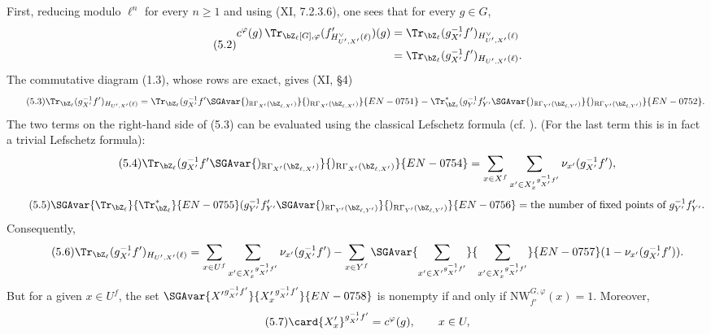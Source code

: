 First, reducing modulo $\ell^n$ for every $n\ge1$ and using (XI, 7.2.3.6), one sees that for every $g\in G$,
\begin{equation}\tag{5.2}
\begin{aligned}
c^\varphi(g)\,\Tr_{\bZ_\ell[G],\varphi}(f'_{H^\vee_{U',X'}(\ell)})(g)
&=\Tr_{\bZ_\ell}(g_{X'}^{-1}f')_{H^\vee_{U',X'}(\ell)}\\
&=\Tr_{\bZ_\ell}(g_{X'}^{-1}f')_{H_{U',X'}(\ell)}.
\end{aligned}
\end{equation}
The commutative diagram (1.3), whose rows are exact, gives (XI, \S4)
\begin{equation}\tag{5.3}
\Tr_{\bZ_\ell}(g_{X'}^{-1}f')_{H_{U',X'}(\ell)}
=\Tr_{\bZ_\ell}(g_{X'}^{-1}f'\SGAvar{)_{\mathbb{R}\Gamma_{X'}(\bZ_{\ell,X'})}}{)_{\mathrm{R}\Gamma_{X'}(\bZ_{\ell,X'})}}{EN-0751}
-\Tr^*_{\bZ_\ell}(g_{Y'}^{-1}f'_{Y'}\SGAvar{)_{\mathbb{R}\Gamma_{Y'}(\bZ_{\ell,Y'})}}{)_{\mathrm{R}\Gamma_{Y'}(\bZ_{\ell,Y'})}}{EN-0752}.
\end{equation}
The two terms on the right-hand side of (5.3) can be evaluated using the classical Lefschetz formula (cf. ). (For the last term this is in fact a trivial Lefschetz formula):
\begin{equation}\tag{5.4}
\Tr_{\bZ_\ell}(g_{X'}^{-1}f'\SGAvar{)_{\mathbb{R}\Gamma_{X'}(\bZ_{\ell,X'})}}{)_{\mathrm{R}\Gamma_{X'}(\bZ_{\ell,X'})}}{EN-0754}
=\sum_{x\in X^f}\sum_{x'\in {X'_x}^{g_{X'}^{-1}f'}}\nu_{x'}(g_{X'}^{-1}f'),
\end{equation}
\begin{equation}\tag{5.5}
\SGAvar{\Tr_{\bZ_\ell}}{\Tr^*_{\bZ_\ell}}{EN-0755}(g_{Y'}^{-1}f'_{Y'}\SGAvar{)_{\mathbb{R}\Gamma_{Y'}(\bZ_{\ell,Y'})}}{)_{\mathrm{R}\Gamma_{Y'}(\bZ_{\ell,Y'})}}{EN-0756}
=\text{the number of fixed points of }g_{Y'}^{-1}f'_{Y'}.
\end{equation}
Consequently,
\begin{equation}\tag{5.6}
\Tr_{\bZ_\ell}(g_{X'}^{-1}f')_{H_{U',X'}(\ell)}
=\sum_{x\in U^f}\sum_{x'\in {X'_x}^{g_{X'}^{-1}f'}}\nu_{x'}(g_{X'}^{-1}f')
-\sum_{x\in Y^f}\SGAvar{\sum_{x'\in {X'}^{g_{X'}^{-1}f'}}}{\sum_{x'\in {X'_x}^{g_{X'}^{-1}f'}}}{EN-0757}(1-\nu_{x'}(g_{X'}^{-1}f')).
\end{equation}
But for a given $x\in U^f$, the set $\SGAvar{{X'}^{g_{X'}^{-1}f'}}{{X'_x}^{g_{X'}^{-1}f'}}{EN-0758}$ is nonempty if and only if $\mathrm{NW}_{f'}^{G,\varphi}(x)=1$. Moreover,
\begin{equation}\tag{5.7}
\card {X'_x}^{g_{X'}^{-1}f'}=c^\varphi(g),
\qquad x\in U,
\end{equation}
